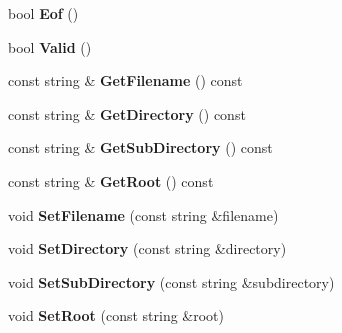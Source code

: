 \begin{DoxyCompactItemize}
\item 
bool {\bfseries Eof} ()\hypertarget{classVSFileSystem_1_1VSFile_aac66685b70a4606c1a5db4c5e97c291d}{}\label{classVSFileSystem_1_1VSFile_aac66685b70a4606c1a5db4c5e97c291d}

\item 
bool {\bfseries Valid} ()\hypertarget{classVSFileSystem_1_1VSFile_a8fcfb0cc2049ef41a23b53bae0a8052c}{}\label{classVSFileSystem_1_1VSFile_a8fcfb0cc2049ef41a23b53bae0a8052c}

\item 
const string \& {\bfseries Get\+Filename} () const \hypertarget{classVSFileSystem_1_1VSFile_aacebe533dd67d8f05665c4563cfe447e}{}\label{classVSFileSystem_1_1VSFile_aacebe533dd67d8f05665c4563cfe447e}

\item 
const string \& {\bfseries Get\+Directory} () const \hypertarget{classVSFileSystem_1_1VSFile_a49d21635d479ea2b10d1a39a670783ed}{}\label{classVSFileSystem_1_1VSFile_a49d21635d479ea2b10d1a39a670783ed}

\item 
const string \& {\bfseries Get\+Sub\+Directory} () const \hypertarget{classVSFileSystem_1_1VSFile_ab3d50970b5b3ae74d2fbc0d8a1b15ff3}{}\label{classVSFileSystem_1_1VSFile_ab3d50970b5b3ae74d2fbc0d8a1b15ff3}

\item 
const string \& {\bfseries Get\+Root} () const \hypertarget{classVSFileSystem_1_1VSFile_abafdb0bbd48f2e2f74e94ebcee12b63a}{}\label{classVSFileSystem_1_1VSFile_abafdb0bbd48f2e2f74e94ebcee12b63a}

\item 
void {\bfseries Set\+Filename} (const string \&filename)\hypertarget{classVSFileSystem_1_1VSFile_ab00a222ca92ed460e4293196d6fd5eb2}{}\label{classVSFileSystem_1_1VSFile_ab00a222ca92ed460e4293196d6fd5eb2}

\item 
void {\bfseries Set\+Directory} (const string \&directory)\hypertarget{classVSFileSystem_1_1VSFile_a76520b70367b47272ecc6308b83745f8}{}\label{classVSFileSystem_1_1VSFile_a76520b70367b47272ecc6308b83745f8}

\item 
void {\bfseries Set\+Sub\+Directory} (const string \&subdirectory)\hypertarget{classVSFileSystem_1_1VSFile_a1f9568d3c04221c861f4a7338bb017a2}{}\label{classVSFileSystem_1_1VSFile_a1f9568d3c04221c861f4a7338bb017a2}

\item 
void {\bfseries Set\+Root} (const string \&root)\hypertarget{classVSFileSystem_1_1VSFile_a67cea37c958741174417466ed6894703}{}\label{classVSFileSystem_1_1VSFile_a67cea37c958741174417466ed6894703}


\end{DoxyCompactItemize}
